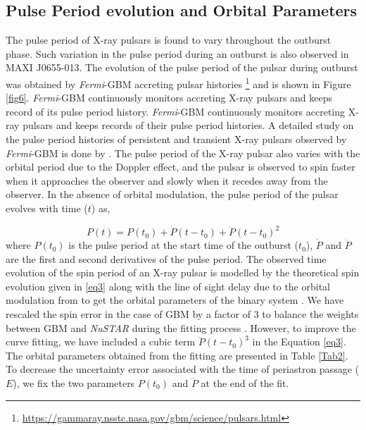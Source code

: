 \documentclass[12pt,a4paper,fleqn,usenatbib]{mnras}
\begin{document}
\subsection{Pulse Period evolution and Orbital Parameters}
The pulse period of X-ray pulsars is found to vary throughout the outburst phase. Such variation in the pulse period during an outburst is also observed in MAXI J0655-013. The evolution of the pulse period of the pulsar during outburst was obtained by \emph{Fermi}-GBM accreting pulsar histories \footnote{\url{https://gammaray.nsstc.nasa.gov/gbm/science/pulsars.html}} and is shown in Figure \ref{fig6}. \emph{Fermi}-GBM continuously monitors accreting X-ray pulsars and keeps record of its pulse period history. \emph{Fermi}-GBM continuously monitors accreting X-ray pulsars and keeps records of their pulse period histories. A detailed study on the pulse period histories of persistent and transient X-ray pulsars observed by \emph{Fermi}-GBM is done by \cite{2020ApJ...896...90M}. The pulse period of the X-ray pulsar also varies with the orbital period due to the Doppler effect, and the pulsar is observed to spin faster when it approaches the observer and slowly when it recedes away from the observer. In the absence of orbital modulation, the pulse period of the pulsar evolves with time ($t$) as,
 
\begin{equation}
P(t)=P(t_{0})+\dot{P}(t-t_{0})+\ddot{P}(t-t_{0})^{2}
\label{eq3}
\end{equation}
where $P(t_{0})$ is the pulse period at the start time of the outburst ($t_{0}$), $\dot{P}$ and $\ddot{P}$ are the first and second derivatives of the pulse period. The observed time evolution of the spin period of an X-ray pulsar is modelled by the theoretical spin evolution given in \ref{eq3} along with the line of sight delay due to the orbital modulation from \cite{1981ApJ...247.1003D} to get the orbital parameters of the binary system \citep{2016MNRAS.457..258T}. We have rescaled the spin error in the case of GBM by a factor of 3 to balance the weights between GBM and \emph{NuSTAR} during the fitting process \citep{2017ApJ...843...69W}. However, to improve the curve fitting, we have included a cubic term $\dddot{P}(t-t_{0})^{3}$ in the Equation \ref{eq3}. The orbital parameters obtained from the fitting are presented in Table \ref{Tab2}. To decrease the uncertainty error associated with the time of periastron passage ($E$), we fix the two parameters $P(t_{0})$ and $\dddot{P}$ at the end of the fit.
\end{document}
